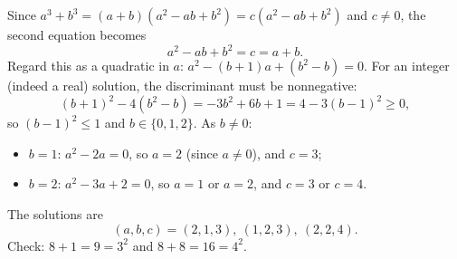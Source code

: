 Since $a^3+b^3=(a+b)\left(a^2-ab+b^2\right)=c\left(a^2-ab+b^2\right)$ and $c\ne0$, the second equation becomes
\[a^2-ab+b^2=c=a+b .\]
Regard this as a quadratic in $a$: $a^2-(b+1)a+\left(b^2-b\right)=0$. For an integer (indeed a real) solution, the discriminant must be nonnegative:
\[(b+1)^2-4\left(b^2-b\right)=-3b^2+6b+1=4-3(b-1)^2\ge0 ,\]
so $(b-1)^2\le1$ and $b\in\{0,1,2\}$. As $b\ne0$:
\begin{itemize}
\item $b=1$: $a^2-2a=0$, so $a=2$ (since $a\ne0$), and $c=3$;
\item $b=2$: $a^2-3a+2=0$, so $a=1$ or $a=2$, and $c=3$ or $c=4$.
\end{itemize}
The solutions are
\[(a,b,c)=\boxed{(2,1,3),\ (1,2,3),\ (2,2,4)} .\]
Check: $8+1=9=3^2$ and $8+8=16=4^2$.
